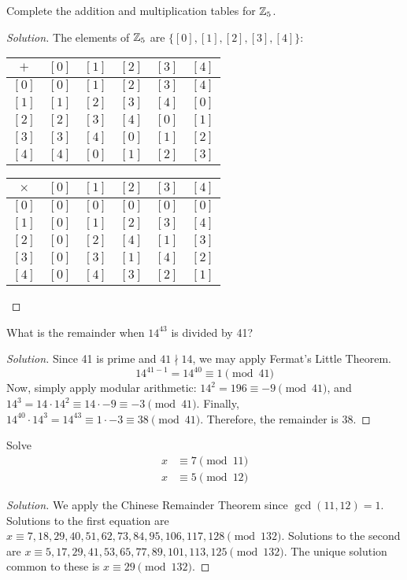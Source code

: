 \question Complete the addition and multiplication tables for $\mathbb{Z}_5$.
\begin{proof}[Solution]
  The elements of $\mathbb{Z}_5$ are $\{[0], [1], [2], [3], [4]\}$:
  \begin{center}
    \begin{tabular}{c|c|c|c|c|c}
      $+$   & $[0]$ & $[1]$ & $[2]$ & $[3]$ & $[4]$ \\ \hline
      $[0]$ & $[0]$ & $[1]$ & $[2]$ & $[3]$ & $[4]$ \\
      $[1]$ & $[1]$ & $[2]$ & $[3]$ & $[4]$ & $[0]$ \\
      $[2]$ & $[2]$ & $[3]$ & $[4]$ & $[0]$ & $[1]$ \\
      $[3]$ & $[3]$ & $[4]$ & $[0]$ & $[1]$ & $[2]$ \\
      $[4]$ & $[4]$ & $[0]$ & $[1]$ & $[2]$ & $[3]$ \\
    \end{tabular}
    \quad
    \begin{tabular}{c|c|c|c|c|c}
      $\times$ & $[0]$ & $[1]$ & $[2]$ & $[3]$ & $[4]$ \\ \hline
      $[0]$    & $[0]$ & $[0]$ & $[0]$ & $[0]$ & $[0]$ \\
      $[1]$    & $[0]$ & $[1]$ & $[2]$ & $[3]$ & $[4]$ \\
      $[2]$    & $[0]$ & $[2]$ & $[4]$ & $[1]$ & $[3]$ \\
      $[3]$    & $[0]$ & $[3]$ & $[1]$ & $[4]$ & $[2]$ \\
      $[4]$    & $[0]$ & $[4]$ & $[3]$ & $[2]$ & $[1]$ \\
    \end{tabular}
  \end{center}
\end{proof}


\question What is the remainder when $14^{43}$ is divided by 41?
\begin{proof}[Solution]
  Since 41 is prime and $41 \nmid 14$, we may apply Fermat's Little Theorem.
  \begin{equation*}
    14^{41-1} = 14^{40} \equiv 1 \pmod{41}
  \end{equation*}
  Now, simply apply modular arithmetic: $14^2 = 196 \equiv -9 \pmod{41}$,
  and $14^3 = 14 \cdot 14^2 \equiv 14 \cdot -9 \equiv -3 \pmod{41}$.
  Finally, $14^{40} \cdot 14^3 = 14^{43} \equiv 1 \cdot -3 \equiv 38 \pmod{41}$.
  Therefore, the remainder is 38.
\end{proof}


\question Solve \begin{align*}
  x & \equiv 7 \pmod{11} \\
  x & \equiv 5 \pmod{12}
\end{align*}
\begin{proof}[Solution]
  We apply the Chinese Remainder Theorem since $\gcd(11,12)=1$.
  Solutions to the first equation are $x \equiv 7,18,29,40,51,62,73,84,95,106,117,128 \pmod{132}$.
  Solutions to the second are $x \equiv 5,17,29,41,53,65,77,89,101,113,125 \pmod{132}$.
  The unique solution common to these is $x \equiv 29 \pmod{132}$.
\end{proof}


